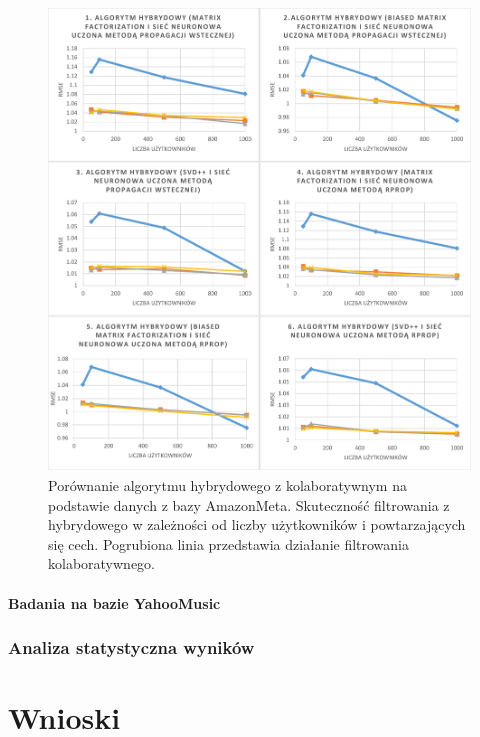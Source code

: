 \documentclass[twoside]{iisthesis}
\begin{document}
\begin{figure}[!ht]
	\centering
	\includegraphics[page=2,width=1\textwidth]{exphybrid_amazon2}
	\caption{Porównanie algorytmu hybrydowego z kolaboratywnym na podstawie danych z bazy AmazonMeta. Skuteczność filtrowania z hybrydowego w zależności od liczby użytkowników i powtarzających się cech. Pogrubiona linia przedstawia działanie filtrowania kolaboratywnego.}
	\label{fig:exphybrid_amazon2b}
\end{figure}


		\subsubsection{Badania na bazie YahooMusic}
	

		\subsection{Analiza statystyczna wyników}		

\chapter{Wnioski}
\end{document}
